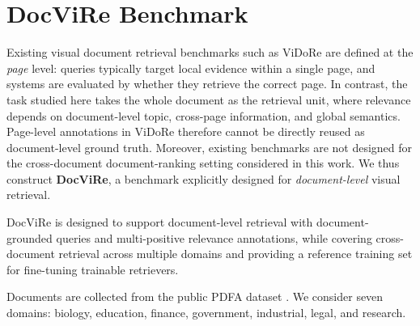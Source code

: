 \section{DocViRe Benchmark}
\label{sec:dataset}

Existing visual document retrieval benchmarks such as ViDoRe are defined at the \emph{page} level: queries typically target local evidence within a single page, and systems are evaluated by whether they retrieve the correct page. In contrast, the task studied here takes the whole document as the retrieval unit, where relevance depends on document-level topic, cross-page information, and global semantics. Page-level annotations in ViDoRe therefore cannot be directly reused as document-level ground truth. Moreover, existing benchmarks are not designed for the cross-document document-ranking setting considered in this work. We thus construct \textbf{DocViRe}, a benchmark explicitly designed for \emph{document-level} visual retrieval.

DocViRe is designed to support document-level retrieval with document-grounded queries and multi-positive relevance annotations, while covering cross-document retrieval across multiple domains and providing a reference training set for fine-tuning trainable retrievers.

Documents are collected from the public PDFA dataset \citep{pdfa_hf_2024}. We consider seven domains: biology, education, finance, government, industrial, legal, and research.

